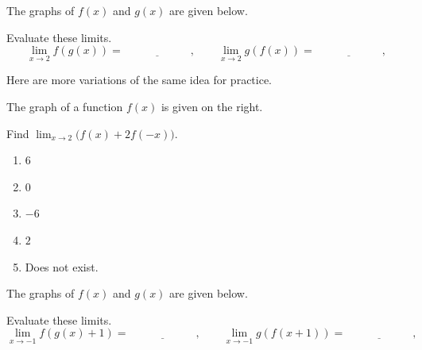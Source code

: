 \documentclass[../main.tex]{subfiles}
\begin{document}
\begin{example} \label{eg:limit-composition-abstract}
  The graphs of \(f(x)\) and \(g(x)\) are given below.

  \begin{center}
    
  \end{center}

  Evaluate these limits.
  \[
    \lim_{x \to 2} f(g(x)) = \underline{\hspace{1in}},
    \qquad
    \lim_{x \to 2} g(f(x)) = \underline{\hspace{1in}},
  \]

  \blanks*
\end{example}
\clearpage

Here are more variations of the same idea for practice.

\begin{exercise}
  The graph of a function \(f(x)\) is given on the right.

  Find \(\lim_{x \to 2} \Big(f(x) + 2 f(-x)\Big)\).

  \begin{sidefigure}{%
      }
    \begin{enumerate}[label=\Alph*., itemsep={2ex}]
      \item \(6\)
      \item \(0\)
      \item \(-6\)
      \item \(2\)
      \item Does not exist.
    \end{enumerate}
  \end{sidefigure}

  \blanks*
\end{exercise}


\begin{exercise} \label{ex:limit-composition-shifted}
  The graphs of \(f(x)\) and \(g(x)\) are given below.

  \begin{center}
    
  \end{center}

  Evaluate these limits.
  \[
    \lim_{x \to -1} f(g(x) + 1) = \underline{\hspace{1in}},
    \qquad
    \lim_{x \to -1} g(f(x + 1)) = \underline{\hspace{1in}},
  \]

  \blanks*
\end{exercise}
\clearpage
\end{document}
